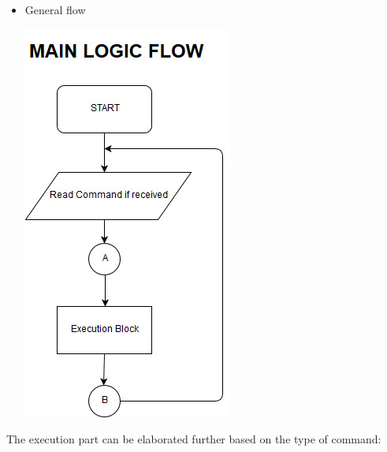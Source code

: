 \documentclass[a4paper,12pt,oneside]{book}
\begin{document}
\begin{itemize}

\item General flow \\
\begin{center}
\includegraphics[scale=0.8]{main_flow2.jpg}
\end{center}
 

\end{itemize}
\pagebreak

\noindent The execution part can be elaborated further based on the type of command:
\end{document}
